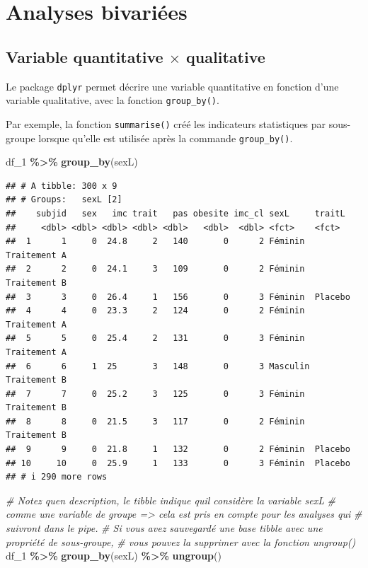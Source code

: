 \documentclass[
]{book}
\newenvironment{Shaded}{\begin{snugshade}}{\end{snugshade}}
\newcommand{\CommentTok}[1]{\textcolor[rgb]{0.56,0.35,0.01}{\textit{#1}}}
\newcommand{\FunctionTok}[1]{\textcolor[rgb]{0.13,0.29,0.53}{\textbf{#1}}}
\newcommand{\NormalTok}[1]{#1}
\newcommand{\SpecialCharTok}[1]{\textcolor[rgb]{0.81,0.36,0.00}{\textbf{#1}}}
\begin{document}
\section{Analyses bivariées}\label{analyses-bivariuxe9es-2}

\subsection{\texorpdfstring{Variable quantitative \(\times\) qualitative}{Variable quantitative \textbackslash times qualitative}}\label{variable-quantitative-times-qualitative-1}

Le package \texttt{dplyr} permet décrire une variable quantitative en fonction d'une variable qualitative, avec la fonction \texttt{group\_by()}.

Par exemple, la fonction \texttt{summarise()} créé les indicateurs statistiques par sous-groupe lorsque qu'elle est utilisée après la commande \texttt{group\_by()}.

\begin{Shaded}
\begin{Highlighting}[]
\NormalTok{df\_1 }\SpecialCharTok{\%\textgreater{}\%}
  \FunctionTok{group\_by}\NormalTok{(sexL)}
\end{Highlighting}
\end{Shaded}

\begin{verbatim}
## # A tibble: 300 x 9
## # Groups:   sexL [2]
##    subjid   sex   imc trait   pas obesite imc_cl sexL     traitL      
##     <dbl> <dbl> <dbl> <dbl> <dbl>   <dbl>  <dbl> <fct>    <fct>       
##  1      1     0  24.8     2   140       0      2 Féminin  Traitement A
##  2      2     0  24.1     3   109       0      2 Féminin  Traitement B
##  3      3     0  26.4     1   156       0      3 Féminin  Placebo     
##  4      4     0  23.3     2   124       0      2 Féminin  Traitement A
##  5      5     0  25.4     2   131       0      3 Féminin  Traitement A
##  6      6     1  25       3   148       0      3 Masculin Traitement B
##  7      7     0  25.2     3   125       0      3 Féminin  Traitement B
##  8      8     0  21.5     3   117       0      2 Féminin  Traitement B
##  9      9     0  21.8     1   132       0      2 Féminin  Placebo     
## 10     10     0  25.9     1   133       0      3 Féminin  Placebo     
## # i 290 more rows
\end{verbatim}

\begin{Shaded}
\begin{Highlighting}[]
\CommentTok{\# Notez qu\textquotesingle{}en description, le tibble indique qu\textquotesingle{}il considère la variable sexL}
\CommentTok{\# comme une variable de groupe =\textgreater{} cela est pris en compte pour les analyses qui }
\CommentTok{\# suivront dans le pipe.}
\CommentTok{\# Si vous avez sauvegardé une base tibble avec une propriété de sous{-}groupe, }
\CommentTok{\# vous pouvez la supprimer avec la fonction ungroup()}
\NormalTok{df\_1 }\SpecialCharTok{\%\textgreater{}\%}
  \FunctionTok{group\_by}\NormalTok{(sexL) }\SpecialCharTok{\%\textgreater{}\%}
  \FunctionTok{ungroup}\NormalTok{()}
\end{Highlighting}
\end{Shaded}
\end{document}

